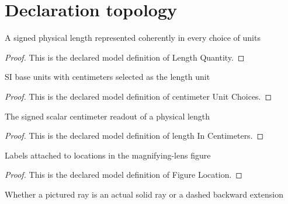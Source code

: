 \section{Declaration topology}
\begin{definition}
  \label{def:physics:phyx-mini-0058:phyxminiproblems-problemphyxmini0058-lengthquantity}
  A signed physical length represented coherently in every choice of units
\end{definition}
\begin{proof}
  This is the declared model definition of Length Quantity.
\end{proof}
\begin{definition}
  \label{def:physics:phyx-mini-0058:phyxminiproblems-problemphyxmini0058-centimeterunitchoices}
  SI base units with centimeters selected as the length unit
\end{definition}
\begin{proof}
  This is the declared model definition of centimeter Unit Choices.
\end{proof}
\begin{definition}
  \label{def:physics:phyx-mini-0058:phyxminiproblems-problemphyxmini0058-lengthincentimeters}
  The signed scalar centimeter readout of a physical length
\end{definition}
\begin{proof}
  This is the declared model definition of length In Centimeters.
\end{proof}
\begin{definition}
  \label{def:physics:phyx-mini-0058:phyxminiproblems-problemphyxmini0058-figurelocation}
  Labels attached to locations in the magnifying-lens figure
\end{definition}
\begin{proof}
  This is the declared model definition of Figure Location.
\end{proof}
\begin{definition}
  \label{def:physics:phyx-mini-0058:phyxminiproblems-problemphyxmini0058-raystyle}
  Whether a pictured ray is an actual solid ray or a dashed backward extension
\end{definition}
